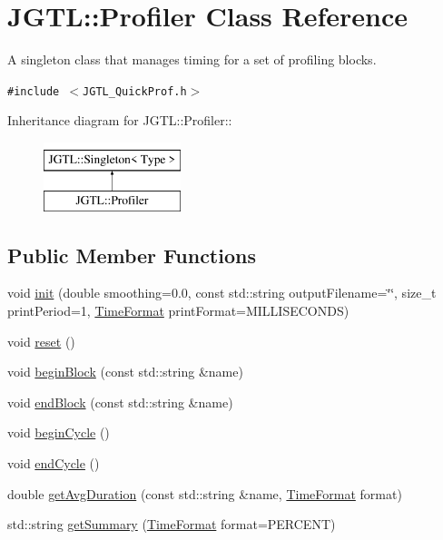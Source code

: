 \hypertarget{class_j_g_t_l_1_1_profiler}{
\section{JGTL::Profiler Class Reference}
\label{class_j_g_t_l_1_1_profiler}
}
A singleton class that manages timing for a set of profiling blocks.  


{\tt \#include $<$JGTL\_\-Quick\-Prof.h$>$}

Inheritance diagram for JGTL::Profiler::\begin{figure}[H]
\begin{center}
\leavevmode
\includegraphics[height=2cm]{class_j_g_t_l_1_1_profiler}
\end{center}
\end{figure}
\subsection*{Public Member Functions}
\begin{CompactItemize}
\item 
void \hyperlink{class_j_g_t_l_1_1_profiler_6e7e7821f35ebd21a067e6ef133e367f}{init} (double smoothing=0.0, const std::string output\-Filename=\char`\"{}\char`\"{}, size\_\-t print\-Period=1, \hyperlink{namespace_j_g_t_l_11a34d88ecadd1c99354adc21fd5abe6}{Time\-Format} print\-Format=MILLISECONDS)
\item 
void \hyperlink{class_j_g_t_l_1_1_profiler_452c2c61daaec460f716b014062287d3}{reset} ()
\item 
void \hyperlink{class_j_g_t_l_1_1_profiler_c77059c32d833a4b638468b88c5dc001}{begin\-Block} (const std::string \&name)
\item 
void \hyperlink{class_j_g_t_l_1_1_profiler_42b4439144f39ab3c2f98ca9145aa99c}{end\-Block} (const std::string \&name)
\item 
void \hyperlink{class_j_g_t_l_1_1_profiler_60a7112d1d40528d3270b25b9c0967c9}{begin\-Cycle} ()
\item 
void \hyperlink{class_j_g_t_l_1_1_profiler_554c28fd5bcb0f181e05b835d3384807}{end\-Cycle} ()
\item 
double \hyperlink{class_j_g_t_l_1_1_profiler_a9e80cbb87225309047515205386270a}{get\-Avg\-Duration} (const std::string \&name, \hyperlink{namespace_j_g_t_l_11a34d88ecadd1c99354adc21fd5abe6}{Time\-Format} format)
\item 
std::string \hyperlink{class_j_g_t_l_1_1_profiler_b168b01e49b5ec112e13a1673ee56fd9}{get\-Summary} (\hyperlink{namespace_j_g_t_l_11a34d88ecadd1c99354adc21fd5abe6}{Time\-Format} format=PERCENT)
\end{CompactItemize}
